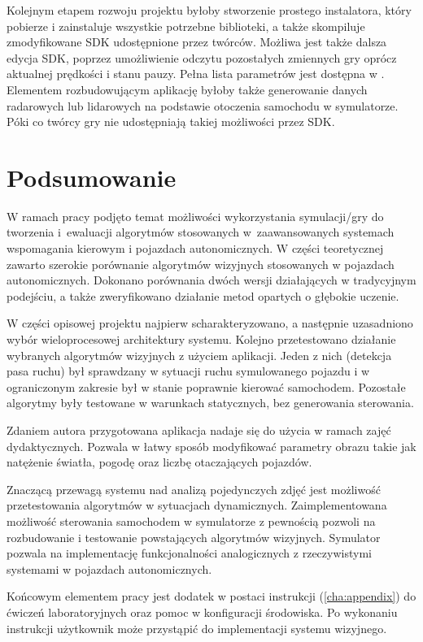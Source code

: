 Kolejnym etapem rozwoju projektu byłoby stworzenie prostego instalatora, który pobierze i zainstaluje wszystkie potrzebne biblioteki, a także skompiluje zmodyfikowane SDK udostępnione przez twórców. 
Możliwa jest także dalsza edycja SDK, poprzez umożliwienie odczytu pozostałych zmiennych gry oprócz aktualnej prędkości i stanu pauzy. 
Pełna lista parametrów jest dostępna w \cite{S3}. 
Elementem rozbudowującym aplikację byłoby także generowanie danych radarowych lub lidarowych na podstawie otoczenia samochodu w symulatorze. 
Póki co twórcy gry nie udostępniają takiej możliwości przez SDK.



\chapter{Podsumowanie}

W ramach pracy podjęto temat możliwości wykorzystania symulacji/gry do tworzenia i~ewaluacji algorytmów stosowanych w~zaawansowanych systemach wspomagania kierowym i pojazdach autonomicznych.
W części teoretycznej zawarto szerokie porównanie algorytmów wizyjnych stosowanych w pojazdach autonomicznych. 
Dokonano porównania dwóch wersji działających w tradycyjnym podejściu, a także zweryfikowano działanie metod opartych o głębokie uczenie. 

W części opisowej projektu najpierw scharakteryzowano, a następnie uzasadniono wybór wieloprocesowej architektury systemu.
Kolejno przetestowano działanie wybranych algorytmów wizyjnych z użyciem aplikacji. Jeden z nich (detekcja pasa ruchu) był sprawdzany w sytuacji ruchu symulowanego pojazdu i w ograniczonym zakresie był w stanie poprawnie kierować samochodem. Pozostałe algorytmy były testowane w warunkach statycznych, bez generowania sterowania.


Zdaniem autora przygotowana aplikacja nadaje się do użycia w ramach zajęć dydaktycznych.
Pozwala w łatwy sposób modyfikować parametry obrazu takie jak natężenie światła, pogodę oraz liczbę otaczających pojazdów. 

Znaczącą przewagą systemu nad analizą pojedynczych zdjęć jest możliwość przetestowania algorytmów w sytuacjach dynamicznych. 
Zaimplementowana możliwość sterowania samochodem w symulatorze z pewnością pozwoli na rozbudowanie i testowanie powstających algorytmów wizyjnych. 
Symulator pozwala na implementację funkcjonalności analogicznych z rzeczywistymi systemami w pojazdach autonomicznych.

Końcowym elementem pracy jest dodatek w postaci instrukcji (\ref{cha:appendix}) do ćwiczeń laboratoryjnych oraz pomoc w konfiguracji środowiska. 
Po wykonaniu instrukcji użytkownik może przystąpić do implementacji systemu wizyjnego.

